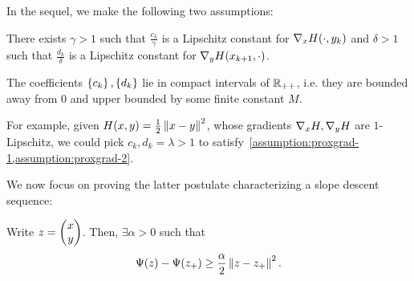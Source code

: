 In the sequel, we make the following two assumptions:
\begin{assumption}
\label{assumption:proxgrad-1}
There exists $\gamma > 1$ such that 
$\frac{c_k}{\gamma}$ is a Lipschitz constant for $\nabla_x H(\cdot, y_k)$ and
$\delta > 1$ such that $\frac{d_k}{\delta}$ is a Lipschitz constant for 
$\nabla_y H(x_{k+1}, \cdot)$.
\end{assumption}

\begin{assumption}
\label{assumption:proxgrad-2}
The coefficients $\left\{ c_k \right\}, \left\{ d_k \right\}$ lie in compact
intervals of $\mathbb{R}_{++}$, i.e. they are bounded away from $0$ and upper bounded
by some finite constant $M$.
\end{assumption}

For example, given $H(x, y) = \frac{1}{2} \left \| x - y \right \|^2$, whose gradients 
$\nabla_x H, \nabla_y H$ are $1$-Lipschitz, we could pick $c_k, d_k = \lambda > 1$
to satisfy~\cref{assumption:proxgrad-1,assumption:proxgrad-2}.

We now focus on proving the latter postulate characterizing a slope descent 
sequence:
\begin{lemma}
    \label{lemma:suff-decr-proxgrad}
    Write $z = \begin{pmatrix} x \\ y \end{pmatrix}$. Then, $\exists \alpha > 0$ such that
    \[
        \Psi(z) - \Psi(z_+) \geq \frac{\alpha}{2} \left \| z - z_+ \right \|^2.
    \]
\end{lemma}